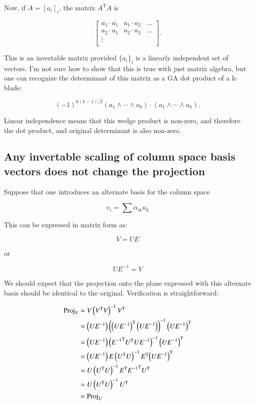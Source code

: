 \documentclass{article}      %
\DeclareMathOperator{\TextTranspose}{T}
\newcommand{\transpose}[1]{{{#1}^{\TextTranspose}}}
\begin{document}
Now, if $A = [a_i]_i$, 
the matrix $\transpose{A}A$ is

\[
\begin{bmatrix}
{a_1} \cdot {a_1} & {a_1} \cdot {a_2} & \hdots \\
{a_2} \cdot {a_1} & {a_2} \cdot {a_2} & \hdots \\
\vdots & & \\
\end{bmatrix}.
\]

This is an invertable matrix provided $\{a_i\}_i$ is a linearly independent set of vectors.
I'm not sure how to show that this is true with just matrix algebra, but one can recognize the determinant of this matrix as a GA dot product of a k-blade:

\[
(-1)^{k(k-1)/2} (a_1 \wedge \cdots \wedge a_k) \cdot (a_1 \wedge \cdots \wedge a_k).
\]

Linear independence means that this wedge product is non-zero, and therefore the dot product, and original determinant is also non-zero.

\subsection{ Any invertable scaling of column space basis vectors does not change the projection }

Suppose that one introduces an alternate basis for the column space

\[
v_i = \sum \alpha_{ik} u_k
\]

This can be expressed in matrix form as:

\[
V = U E
\]

or

\[
U E^{-1} = V
\]

We should expect that the projection onto the plane expressed with this alternate basis should be identical to the original.  Verification
is straightforward:

\begin{align*}
\Proj_V 
&= V \left(\transpose{V} V\right)^{-1} \transpose{V} \\
&= \left(U E^{-1}\right) \left(\transpose{\left(U E^{-1}\right)} \left(U E^{-1}\right)\right)^{-1} \transpose{\left(U E^{-1}\right)} \\
&= \left(U E^{-1}\right) \left( \transpose{E^{-1}} \transpose{U} U E^{-1}\right)^{-1} \transpose{\left(U E^{-1}\right)} \\
&= \left(U E^{-1}\right) E \left( \transpose{U}U\right)^{-1} \transpose{E} \transpose{\left(U E^{-1}\right)} \\
&= U \left( \transpose{U}U\right)^{-1} \transpose{E} \transpose{E^{-1}} \transpose{U} \\
&= U \left( \transpose{U}U\right)^{-1} \transpose{U} \\
&= \Proj_U
\end{align*}
\end{document}
